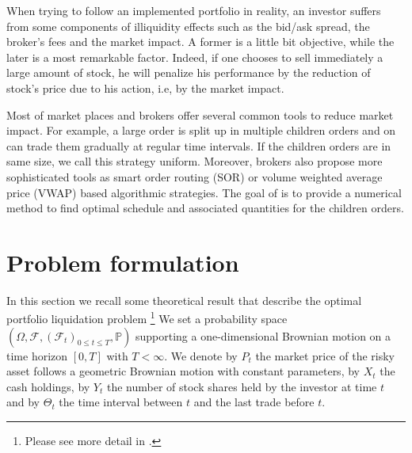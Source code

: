 \documentclass{article}
\begin{document}
\par When trying to follow an implemented portfolio in reality, an investor suffers from some components of illiquidity effects such as the bid/ask spread, the broker's fees and the market impact. A former is a little bit objective, while the later is a most remarkable factor. Indeed, if one chooses to sell immediately a large amount of stock, he will penalize his performance by the reduction of stock’s price due to his action, i.e, by the market impact. 

\par Most of market places and brokers offer several common tools to reduce market impact. For example, a large order is split up in multiple children orders and on can trade them gradually at regular time intervals. If the children orders are in same size, we call this strategy uniform. Moreover, brokers also propose more sophisticated tools as smart order routing (SOR) or volume weighted average price (VWAP) based algorithmic strategies. The goal of \cite{GMP} is to provide a numerical method to find optimal schedule and associated quantities for the children orders. 

\section{Problem formulation}
In this section we recall some theoretical result that describe the optimal portfolio liquidation problem \footnote{Please see more detail in \cite{KP}.} We set a probability space $\left(\Omega,\mathcal{F}, \left(\mathcal{F}_t\right)_{0\le t\le T}, \mathbb{P}\right)$ supporting a one-dimensional Brownian motion on a time horizon $[0, T]$ with $T < \infty$. We denote by $P_t$
the market price of the risky asset follows a geometric Brownian motion with constant parameters, by $X_t$ the cash holdings, by $Y_t$ the number of stock shares held by the investor at time $t$ and by $\Theta_t$ the time interval between $t$ and the last trade before $t$. 
\end{document}
